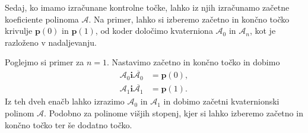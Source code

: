 \documentclass[mat1]{fmfdelo}
\newcommand{\ii}{\boldsymbol i}
\newcommand{\pp}{\boldsymbol p}
\newcommand{\A}{\mathcal A}
\begin{document}
\iffalse
Z višanjem stopnje začetnega polinoma, dobimo več prostih parametrov, kar lahko izkoristimo pri konstrukciji krivulje. Več o tem kasneje.
\fi
Sedaj, ko imamo izračunane kontrolne točke, lahko iz njih izračunamo začetne koeficiente polinoma $\A$. Na primer, lahko si izberemo začetno in končno točko krivulje $\pp(0)$ in $\pp(1)$, od koder določimo kvaterniona $\A_0$ in  $\A_n$, kot je razloženo v nadaljevanju.
\begin{primer}Poglejmo si primer za	$n=1$. Nastavimo začetno in končno točko in dobimo
	\begin{equation*}
	\begin{split}
		\A_0\ii\overline{\A_0} &= \pp(0), \\
		\A_1\ii\overline{\A_1} &= \pp(1).
	\end{split}
\end{equation*}
Iz teh dveh enačb lahko izrazimo $\A_0$ in $\A_1$ in dobimo začetni kvaternionski polinom $\A$. Podobno za polinome višjih stopenj, kjer si lahko izberemo začetno in končno točko ter še dodatno točko.	
\end{primer}
\end{document}
